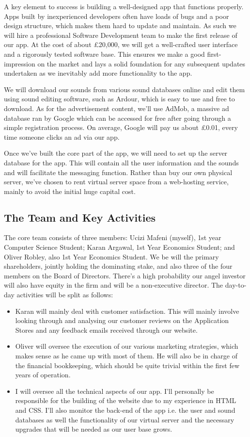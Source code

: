 \documentclass[12pt]{article}
\begin{document}
A key element to success is building a well-designed app that functions properly. Apps built by inexperienced developers often have loads of bugs and a poor design structure, which makes them hard to update and maintain. As such we will hire a professional Software Development team to make the first release of our app. At the cost of about £20,000, we will get a well-crafted user interface and a rigorously tested software base. This ensures we make a good first-impression on the market and lays a solid foundation for any subsequent updates undertaken as we inevitably add more functionality to the app.

We will download our sounds from various sound databases online and edit them using sound editing software, such as Ardour, which is easy to use and free to download. As for the advertisement content, we’ll use AdMob, a massive ad database ran by Google which can be accessed for free after going through a simple registration process. On average, Google will pay us about £0.01, every time someone clicks an ad via our app.

Once we’ve built the core part of the app, we will need to set up the server database for the app. This will contain all the user information and the sounds and will facilitate the messaging function. Rather than buy our own physical server, we’ve chosen to rent virtual server space from a web-hosting service, mainly to avoid the initial huge capital cost.

\subsection{The Team and Key Activities}

The core team consists of three members: Ucizi Mafeni (myself), 1st year Computer Science Student; Karan Argawal, 1st Year Economics Student; and Oliver Robley, also 1st Year Economics Student. We be will the primary shareholders, jointly holding the dominating stake, and also three of the four members on the Board of Directors. There’s a high probability our angel investor will also have equity in the firm and will be a non-executive director.
The day-to-day activities will be split as follows:
\begin{itemize}
    \item Karan will mainly deal with customer satisfaction. This will mainly involve looking through and analysing our customer reviews on the Application Stores and any feedback emails received through our website.
    \item Oliver will oversee the execution of our various marketing strategies, which makes sense as he came up with most of them. He will also be in charge of the financial bookkeeping, which should be quite trivial within the first few years of operation.
    \item I will oversee all the technical aspects of our app. I'll personally be responsible for the building of the website due to my experience in HTML and CSS. I'll also monitor the back-end of the app i.e. the user and sound databases as well the functionality of our virtual server and the necessary upgrades that will be needed as our user base grows.
\end{itemize}
\end{document}
